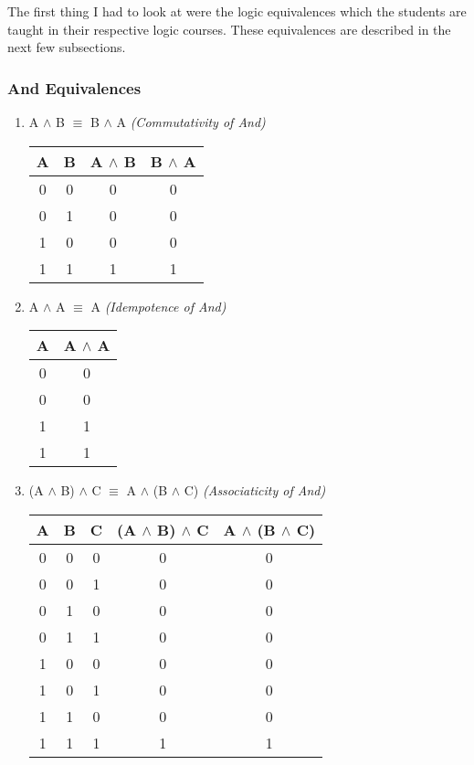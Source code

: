 \documentclass[12pt]{article}
\begin{document}
The first thing I had to look at were the logic equivalences which the students
are taught in their respective logic courses. These equivalences are described
in the next few subsections.

\subsubsection{And Equivalences}
\begin{enumerate}

  \item A $\land$ B $\equiv$ B $\land$ A \emph{(Commutativity of And)}

\begin{center}
  \begin{tabular}{| c | c | c | c |}
    \hline
    A & B & A $\land$ B & B $\land$ A \\ \hline
    0 & 0 & 0 & 0 \\
    0 & 1 & 0 & 0 \\
    1 & 0 & 0 & 0 \\
    1 & 1 & 1 & 1 \\ \hline
  \end{tabular}
\end{center}

  \item A $\land$ A $\equiv$ A \emph{(Idempotence of And)}

\begin{center}
  \begin{tabular}{| c | c |}
    \hline
    A & A $\land$ A \\ \hline
    0 & 0 \\
    0 & 0 \\
    1 & 1 \\
    1 & 1 \\ \hline
  \end{tabular}
\end{center}

  \item (A $\land$ B) $\land$ C $\equiv$ A $\land$ (B $\land$ C) \emph{(Associaticity of And)}

\begin{center}
  \begin{tabular}{| c | c | c | c | c |}
    \hline
    A & B & C & (A $\land$ B) $\land$ C & A $\land$ (B $\land$ C) \\ \hline
    0 & 0 & 0 & 0 & 0 \\
    0 & 0 & 1 & 0 & 0 \\
    0 & 1 & 0 & 0 & 0 \\
    0 & 1 & 1 & 0 & 0 \\
    1 & 0 & 0 & 0 & 0 \\
    1 & 0 & 1 & 0 & 0 \\
    1 & 1 & 0 & 0 & 0 \\
    1 & 1 & 1 & 1 & 1 \\ \hline
  \end{tabular}
\end{center}
\end{enumerate}
\end{document}
